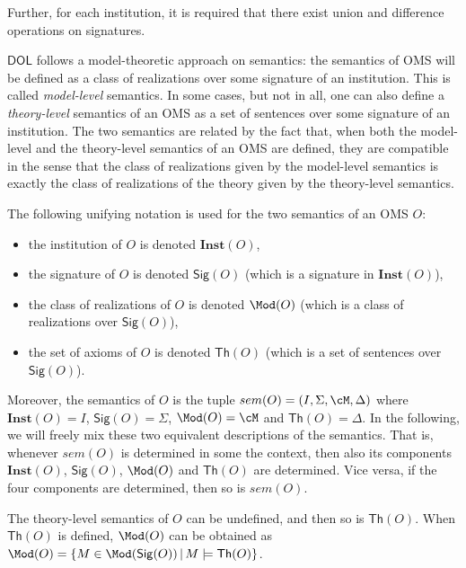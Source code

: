 \documentclass[10pt, a4paper]{isov2}
\newcommand{\Sig}{\mathsf{Sig}}
\renewcommand{\Th}{\mathsf{Th}}
\newcommand{\Inst}{\ensuremath{\mathbf{Inst}}}
\newcommand*{\DOL}{\ensuremath{\mathsf{DOL}}\xspace}
\begin{document}
Further,  for each institution, it is required that there exist union and difference operations on signatures.

\medskip

\DOL follows a model-theoretic approach on semantics: the semantics of OMS will be defined as a class of realizations
over some signature of an institution. This is called \emph{model-level}  semantics. In some cases, but not in all, one can also define
a \emph{theory-level} semantics of an OMS as a set of sentences over some signature of an institution. The two semantics are
related by the fact that, when both the model-level and the theory-level semantics of an OMS are defined, they are compatible in the
sense that the class of realizations given by the model-level semantics is exactly the class of realizations of the theory given by the
theory-level semantics.

 The following unifying notation is used for the two semantics of an OMS $O$:\begin{itemize}
 \item the institution of $O$ is denoted $\Inst(O)$,
  \item the signature of $O$ is denoted $\Sig(O)$ (which is a signature in $\Inst(O)$),
  \item the class of realizations of $O$ is denoted $\Mod(O)$ (which is a class of realizations over $\Sig(O)$),
  \item the set of axioms of $O$ is denoted $\Th(O)$ (which is a set of sentences over $\Sig(O)$).
\end{itemize}
\noindent Moreover, the semantics of $O$ is the tuple $sem(O) = (I, \Sigma, \cM,\Delta)$
where $\Inst(O) = I$, $\Sig(O) = \Sigma$, $\Mod(O) = \cM$ and $\Th(O) = \Delta$.
In the following, we will freely mix these two equivalent descriptions of the semantics. That is, whenever $sem(O)$ is determined in some the context, then also its components $\Inst(O)$, $\Sig(O)$, $\Mod(O)$ and $\Th(O)$ are determined. Vice versa, if the four components are determined, then so is $sem(O)$.

The theory-level semantics of $O$ can be undefined, and then so is $\Th(O)$. When $\Th(O)$ is defined, $\Mod(O)$ can be obtained as $\Mod(O)=\{M\in\Mod(\Sig(O)) \,|\, M\models\Th(O)\}$.
\end{document}
